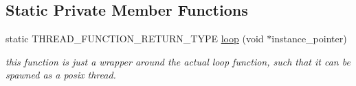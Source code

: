\subsection*{Static Private Member Functions}
\begin{DoxyCompactItemize}
\item 
static T\+H\+R\+E\+A\+D\+\_\+\+F\+U\+N\+C\+T\+I\+O\+N\+\_\+\+R\+E\+T\+U\+R\+N\+\_\+\+T\+Y\+PE \hyperlink{classblmc__drivers_1_1ConstTorqueControl_a8598e9ab1701eb978bf1155fc38c8736}{loop} (void $\ast$instance\+\_\+pointer)\hypertarget{classblmc__drivers_1_1ConstTorqueControl_a8598e9ab1701eb978bf1155fc38c8736}{}\label{classblmc__drivers_1_1ConstTorqueControl_a8598e9ab1701eb978bf1155fc38c8736}

\begin{DoxyCompactList}\small\item\em this function is just a wrapper around the actual loop function, such that it can be spawned as a posix thread. \end{DoxyCompactList}\end{DoxyCompactItemize}
